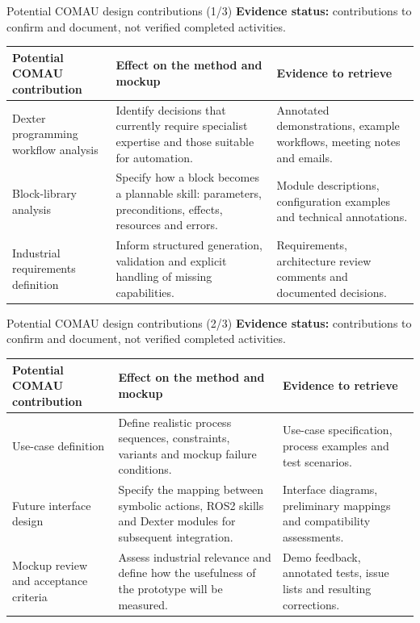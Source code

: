 \documentclass[aspectratio=169,10pt]{beamer}
\begin{document}
\begin{frame}{Potential COMAU design contributions (1/3)}
\small
\textbf{Evidence status:} contributions to confirm and document, not verified completed activities.
\medskip
\renewcommand{\arraystretch}{1.35}
\begin{tabularx}{\textwidth}{@{}>{\raggedright\arraybackslash}p{}XX@{}}
\toprule
Potential COMAU contribution & Effect on the method and mockup & Evidence to retrieve\\\midrule
Dexter programming workflow analysis & Identify decisions that currently require specialist expertise and those suitable for automation. & Annotated demonstrations, example workflows, meeting notes and emails.\\
Block-library analysis & Specify how a block becomes a plannable skill: parameters, preconditions, effects, resources and errors. & Module descriptions, configuration examples and technical annotations.\\
Industrial requirements definition & Inform structured generation, validation and explicit handling of missing capabilities. & Requirements, architecture review comments and documented decisions.\\
\bottomrule
\end{tabularx}
\end{frame}

\begin{frame}{Potential COMAU design contributions (2/3)}
\small
\textbf{Evidence status:} contributions to confirm and document, not verified completed activities.
\medskip
\renewcommand{\arraystretch}{1.35}
\begin{tabularx}{\textwidth}{@{}>{\raggedright\arraybackslash}p{}XX@{}}
\toprule
Potential COMAU contribution & Effect on the method and mockup & Evidence to retrieve\\\midrule
Use-case definition & Define realistic process sequences, constraints, variants and mockup failure conditions. & Use-case specification, process examples and test scenarios.\\
Future interface design & Specify the mapping between symbolic actions, ROS2 skills and Dexter modules for subsequent integration. & Interface diagrams, preliminary mappings and compatibility assessments.\\
Mockup review and acceptance criteria & Assess industrial relevance and define how the usefulness of the prototype will be measured. & Demo feedback, annotated tests, issue lists and resulting corrections.\\
\bottomrule
\end{tabularx}
\end{frame}
\end{document}
